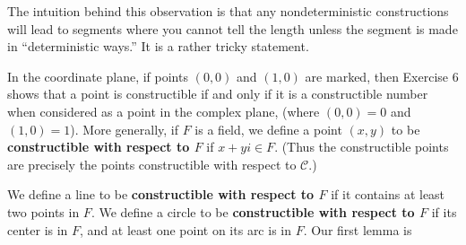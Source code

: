 \documentclass[leqno]{book}
\begin{document}
The intuition behind this observation is that any nondeterministic constructions will lead to segments where you cannot tell the length unless the segment is made in ``deterministic ways.''  It is a rather tricky statement.

In the coordinate plane, if points $(0,0)$ and $(1,0)$ are marked, then Exercise 6 shows that a point is constructible if and only if it is a constructible number when considered as a point in the complex plane, (where $(0,0)=0$ and $(1,0)=1$).  More generally, if $F$ is a field, we define a point $(x,y)$ to be \textbf{constructible with respect to $F$} if $x+yi\in F$.  (Thus the constructible points are precisely the points constructible with respect to $\mathscr C$.)

We define a line to be \textbf{constructible with respect to $F$} if it contains at least two points in $F$.  We define a circle to be \textbf{constructible with respect to $F$} if its center is in $F$, and at least one point on its arc is in $F$.  Our first lemma is\\
\end{document}
